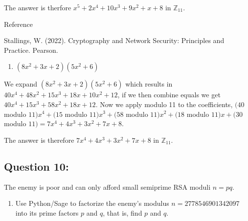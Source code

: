\documentclass[11pt]{article}
\providecommand{\tightlist}{%
      \setlength{\itemsep}{0pt}\setlength{\parskip}{0pt}}
\begin{document}
The answer is therfore \(x^{5}+2x^{4}+10x^{3}+9x^{2}+x+8\) in
\(\mathbb Z_{11}\).

Reference

Stallings, W. (2022). Cryptography and Network Security: Principles and
Practice. Pearson.

    \begin{enumerate}
\def\labelenumi{\alph{enumi})}
\setcounter{enumi}{1}
\tightlist
\item
  \((8x^2 + 3x + 2)(5x^2 + 6)\)
\end{enumerate}

    We expand \((8x^{2}+3x+2)(5x^{2}+6)\) which results in
\(40x^{4}+48x^{2}+15x^{3}+18x+10x^{2}+12\), if we then combine equals we
get \(40x^{4}+15x^{3}+58x^{2}+18x+12\). Now we apply modulo 11 to the
coefficients, \((40\) modulo \(11)x^{4}+(15\) modulo \(11)x^{3}+(58\)
modulo \(11)x^{2}+(18\) modulo \(11)x+(30\) modulo
\(11) = 7x^{4}+4x^{3}+3x^{2}+7x+8\).

The answer is therefore \(7x^{4}+4x^{3}+3x^{2}+7x+8\) in
\(\mathbb Z_{11}\).

    \hypertarget{question-10}{%
\subsection{Question 10:}\label{question-10}}

The enemy is poor and can only afford small semiprime RSA moduli
\(n=pq\).

\begin{enumerate}
\def\labelenumi{\alph{enumi})}
\tightlist
\item
  Use Python/Sage to factorize the enemy's modulus
  \(n=2778546901342097\) into its prime factors \(p\) and \(q\), that
  is, find \(p\) and \(q\).
\end{enumerate}
\end{document}
